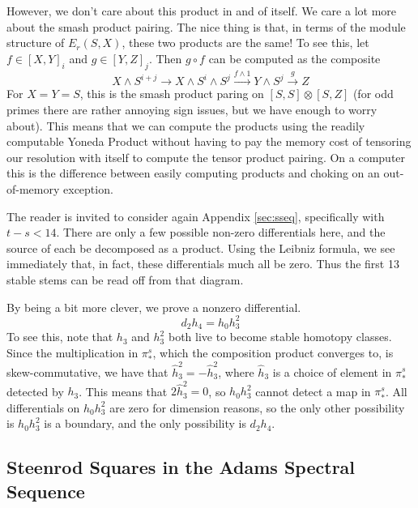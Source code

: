 However, we don't care about this product in and of itself.  
We care a lot more about the smash product pairing.
The nice thing is that, in terms of the module structure of $E_r(S,X)$, these two products are the same!
To see this, let $f\in [X,Y]_i$ and $g\in [Y,Z]_j$.  Then $g\circ f$ can be computed as the composite
\[X\wedge S^{i+j}\to X\wedge S^i\wedge S^j\xrightarrow{f\wedge1} Y\wedge S^j\xrightarrow{g} Z\]
For $X=Y=S$, this is the smash product paring on $[S,S]\otimes [S,Z]$ (for odd primes there are rather annoying sign issues, but we have enough to worry about).  
This means that we can compute the products using the readily computable Yoneda Product without having to pay the memory cost of tensoring our resolution with itself to compute the tensor product pairing.  
On a computer this is the difference between easily computing products and choking on an out-of-memory exception.  

The reader is invited to consider again Appendix \ref{sec:sseq}, specifically with $t-s<14$.
There are only a few possible non-zero differentials here, and the source of each be decomposed as a product.  
Using the Leibniz formula, we see immediately that, in fact, these differentials much all be zero.
Thus the first 13 stable stems can be read off from that diagram.

By being a bit more clever, we prove a nonzero differential.
\[d_2h_4=h_0h_3^2\]
To see this, note that $h_3$ and $h_3^2$ both live to become stable homotopy classes.
Since the multiplication in $\pi^s_*$, which the composition product converges to, is skew-commutative, we have that $\hat{h}_3^2=-\hat{h}_3^2$, where $\hat{h}_3$ is a choice of element in $\pi_*^s$ detected by $h_3$.  
This means that $2\hat{h}_3^2=0$, so $h_0h_3^2$ cannot detect a map in $\pi_*^s$.  
All differentials on $h_0h_3^2$ are zero for dimension reasons, so the only other possibility is $h_0h_3^2$ is a boundary, and the only possibility is $d_2h_4$.  



\subsection{Steenrod Squares in the Adams Spectral Sequence}


